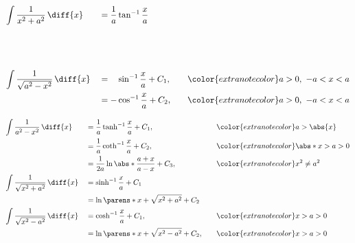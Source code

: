 \begin{myminipage}[t]{0.5\linewidth}
    \begin{HackEquationLeftAlign}
    \begin{alignat*}{3}
        &\int{\frac{1}{x^2 + a^2} \,\diff{x}} &&= \frac{1}{a} \tan^{-1}{\frac{x}{a}}
            && \\
        \vphantom{
            = \frac{1}{a} \coth^{-1}{\frac{x}{a}} + C_2
        } \\
        \vphantom{
            = \frac{1}{2a} \ln{\abs*{\frac{a+x}{a-x}}} + C_3
        } \\
        &\int{\frac{1}{\sqrt{a^2 - x^2}} \,\diff{x}} &&= \hphantom{-} \sin^{-1}{\frac{x}{a}} + C_1
            ,\quad
            &&{\color{extranotecolor}
                a > 0 ,\ -a < x < a
            } \\
        & &&= - \cos^{-1}{\frac{x}{a}} + C_2
            ,\quad
            &&{\color{extranotecolor}
                a > 0 ,\ -a < x < a
            }
    \end{alignat*}
    \end{HackEquationLeftAlign}%
\end{myminipage}%
\begin{myminipage}[t]{0.5\linewidth}
    \begin{HackEquationLeftAlign}
    \begin{alignat*}{3}
        &\int{\frac{1}{a^2 - x^2} \,\diff{x}} &&= \frac{1}{a} \tanh^{-1}{\frac{x}{a}} + C_1
            ,\quad
            &&{\color{extranotecolor}
                a > \abs{x}
            } \\
        & &&= \frac{1}{a} \coth^{-1}{\frac{x}{a}} + C_2
            ,\quad
            &&{\color{extranotecolor}
                \abs*{x} > a > 0
            } \\
        & &&= \frac{1}{2a} \ln{\abs*{\frac{a+x}{a-x}}} + C_3
            ,\quad
            &&{\color{extranotecolor}
                x^2 \neq a^2
            } \\
        &\int{\frac{1}{\sqrt{x^2 + a^2}} \,\diff{x}} &&= \sinh^{-1}{\frac{x}{a}} + C_1
            && \\
        & &&= \ln{\parens*{x + \sqrt{x^2 + a^2}}} + C_2
            && \\
        &\int{\frac{1}{\sqrt{x^2 - a^2}} \,\diff{x}} &&= \cosh^{-1}{\frac{x}{a}} + C_1
            ,\quad
            &&{\color{extranotecolor}
                x > a > 0
            } \\
        & &&= \ln{\parens*{x + \sqrt{x^2 - a^2}}} + C_2
            ,\quad
            &&{\color{extranotecolor}
                x > a > 0
            }
    \end{alignat*}
    \end{HackEquationLeftAlign}%
\end{myminipage}

